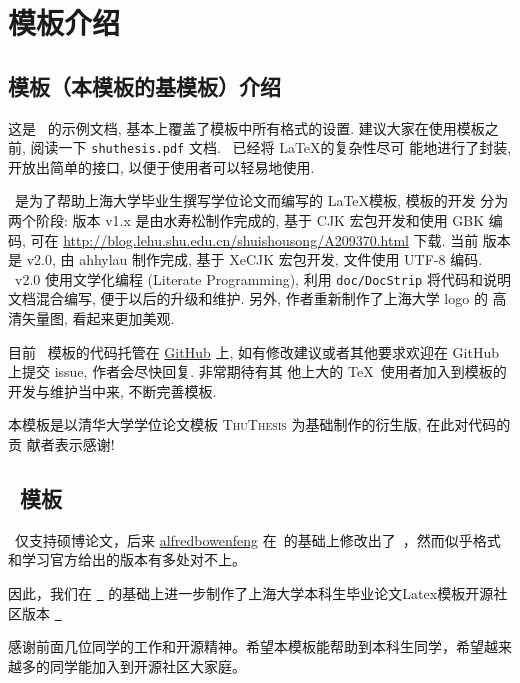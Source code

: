 \chapter{模板介绍}
\label{cha:intro}

\section{\shuthesis 模板（本模板的基模板）介绍}
这是 \shuthesis\ 的示例文档, 基本上覆盖了模板中所有格式的设置. 建议大家在使用模板之
前, 阅读一下 \texttt{shuthesis.pdf} 文档. \shuthesis\ 已经将 \LaTeX 的复杂性尽可
能地进行了封装, 开放出简单的接口, 以便于使用者可以轻易地使用.

\shuthesis\ 是为了帮助上海大学毕业生撰写学位论文而编写的 \LaTeX 模板, 模板的开发
分为两个阶段: 版本 v1.x 是由水寿松制作完成的, 基于 CJK 宏包开发和使用 GBK 编码, 
可在 \url{http://blog.lehu.shu.edu.cn/shuishousong/A209370.html} 下载. 当前
版本是 v2.0, 由 ahhylau 制作完成, 基于 XeCJK 宏包开发, 文件使用 UTF-8 编码. 
\shuthesis\ v2.0 使用文学化编程 (Literate Programming), 利用 \texttt{doc/DocStrip} 
将代码和说明文档混合编写, 便于以后的升级和维护. 另外, 作者重新制作了上海大学 logo 的
高清矢量图, 看起来更加美观. 

目前 \shuthesis\ 模板的代码托管在 \href{https://github.com/ahhylau/shuthesis}{GitHub} 
上, 如有修改建议或者其他要求欢迎在 GitHub 上提交 issue, 作者会尽快回复. 非常期待有其
他上大的 \TeX\ 使用者加入到模板的开发与维护当中来, 不断完善模板.

本模板是以清华大学学位论文模板 \textsc{ThuThesis} 为基础制作的衍生版, 在此对代码的贡
献者表示感谢!

\section{\shubachelorthesisOSC\ 模板}
\shuthesis\ 仅支持硕博论文，后来 \href{https://github.com/alfredbowenfeng}{alfredbowenfeng}
在\shuthesis\ 的基础上修改出了\shubachelorthesis\ ，然而似乎格式和学习官方给出的版本有多处对不上。

因此，我们在 \href{https://github.com/alfredbowenfeng/SHU-Bachelor-Thesis}{\shubachelorthesis\ } 
的基础上进一步制作了上海大学本科生毕业论文Latex模板开源社区版本
\href{https://github.com/EnJiang/SHU-Bachelor-Thesis-OSC}{\shubachelorthesisOSC\ }


感谢前面几位同学的工作和开源精神。希望本模板能帮助到本科生同学，希望越来越多的同学能加入到开源社区大家庭。

